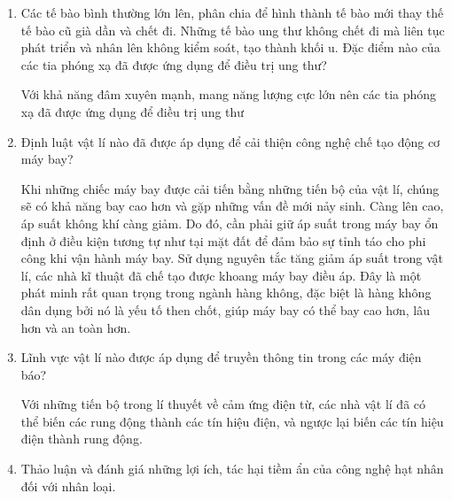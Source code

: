 \begin{enumerate}[label=\bfseries Câu \arabic*:]
{	}
	\item {}
	
	
	{
		Các tế bào bình thường lớn lên, phân chia để hình thành tế bào mới thay thế tế bào cũ già dần và chết  đi. Những tế bào ung thư không chết đi mà liên tục phát triển và nhân lên không kiểm soát, tạo thành khối u. Đặc điểm nào của các tia phóng xạ đã được ứng dụng để điều trị ung thư?
	}
	
	\hideall
	{
		Với khả năng đâm xuyên mạnh, mang năng lượng cực lớn nên các tia phóng xạ đã được ứng dụng để điều trị ung thư
	}
	\item {}
	
	
	{
		Định luật vật lí nào đã được áp dụng để cải thiện công nghệ chế tạo động cơ máy bay?
	}
	
	\hideall
	{
		Khi những chiếc máy bay được cải tiến bằng những tiến bộ của vật lí, chúng sẽ có khả năng bay cao hơn và gặp những vấn đề mới nảy sinh. Càng lên cao, áp suất không khí càng giảm. Do đó, cần phải giữ áp suất trong máy bay ổn định ở điều kiện tương tự như tại mặt đất để đảm bảo sự tỉnh táo cho phi công khi vận hành máy bay. Sử dụng nguyên tắc tăng giảm áp suất trong vật lí, các nhà kĩ thuật đã chế tạo được khoang máy bay điều áp. Đây là một phát minh rất quan trọng trong ngành hàng không, đặc biệt là hàng không dân dụng bởi nó là yếu tố then chốt, giúp máy bay có thể bay cao hơn, lâu hơn và an toàn hơn.
	}
	\item {}
	
	
	{
		Lĩnh vực vật lí nào được áp dụng để truyền thông tin trong các máy điện báo?
	}
	
	\hideall
	{
		Với những tiến bộ trong lí thuyết về cảm ứng điện từ, các nhà vật lí đã có thể biến các rung động thành các tín hiệu điện, và ngược lại biến các tín hiệu điện thành rung động.
		
	}
	\item {}
	
	{
		Thảo luận và đánh giá những lợi ích, tác hại tiềm ẩn của công nghệ hạt nhân đối với nhân loại.
	}
	
\end{enumerate}
